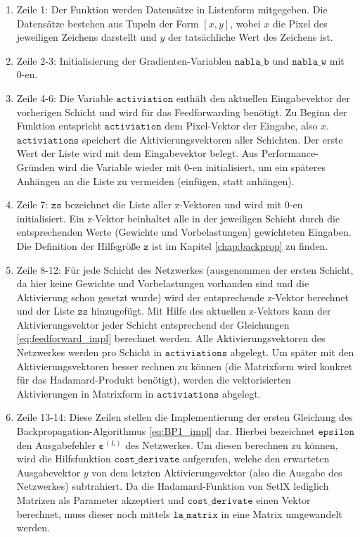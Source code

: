 \begin{enumerate}
\item Zeile 1: Der Funktion werden Datensätze in Listenform mitgegeben. Die Datensätze bestehen aus Tupeln der Form $[x,y]$, wobei $x$ die Pixel des jeweiligen Zeichens darstellt und $y$ der tatsächliche Wert des Zeichens ist.
\item Zeile 2-3: Initialisierung der Gradienten-Variablen $\mathtt{nabla\_b}$ und $\mathtt{nabla\_w}$ mit 0-en.
\item Zeile 4-6: Die Variable $\mathtt{activiation}$ enthält den aktuellen Eingabevektor der vorherigen Schicht und wird für das Feedforwarding benötigt. Zu Beginn der Funktion entspricht $\mathtt{activiation}$ dem Pixel-Vektor der Eingabe, also $x$. $\mathtt{activiations}$ speichert die Aktivierungsvektoren aller Schichten. Der erste Wert der Liste wird mit dem Eingabevektor belegt. Aus Performance-Gründen wird die Variable wieder mit 0-en initialisiert, um ein späteres Anhängen an die Liste zu vermeiden (einfügen, statt anhängen).
\item Zeile 7: $\mathtt{zs}$ bezeichnet die Liste aller z-Vektoren und wird mit 0-en initialisiert. Ein z-Vektor beinhaltet alle in der jeweiligen Schicht durch die entsprechenden Werte (Gewichte und Vorbelastungen) gewichteten Eingaben. Die Definition der Hilfsgröße $\mathtt{z}$ ist im Kapitel \ref{chap:backprop} zu finden.
\item Zeile 8-12: Für jede Schicht des Netzwerkes (ausgenommen der ersten Schicht, da hier keine Gewichte und Vorbelastungen vorhanden sind und die Aktivierung schon gesetzt wurde) wird der entsprechende z-Vektor berechnet und der Liste $\mathtt{zs}$ hinzugefügt. Mit Hilfe des aktuellen z-Vektors kann der Aktivierungsvektor jeder Schicht entsprechend der Gleichungen \eqref{eq:feedforward_impl} berechnet werden. Alle Aktivierungsvektoren des Netzwerkes werden pro Schicht in $\mathtt{activiations}$ abgelegt. Um später mit den Aktivierungsvektoren besser rechnen zu können (die Matrixform wird konkret für das Hadamard-Produkt benötigt), werden die vektorisierten Aktivierungen in Matrixform in $\mathtt{activiations}$ abgelegt.
\item Zeile 13-14: Diese Zeilen stellen die Implementierung der ersten Gleichung des Backpropagation-Algorithmus \eqref{eq:BP1_impl} dar. Hierbei bezeichnet $\mathtt{epsilon}$ den Ausgabefehler $\boldsymbol{\varepsilon}^{(L)}$ des Netzwerkes. Um diesen berechnen zu können, wird die Hilfsfunktion $\mathtt{cost\_derivate}$ aufgerufen, welche den erwarteten Ausgabevektor $y$ von dem letzten Aktivierungsvektor (also die Ausgabe des Netzwerkes) subtrahiert. Da die Hadamard-Funktion von SetlX lediglich Matrizen als Parameter akzeptiert und $\mathtt{cost\_derivate}$ einen Vektor berechnet, muss dieser noch mittels $\mathtt{la\_matrix}$ in eine Matrix umgewandelt werden.

\end{enumerate}
